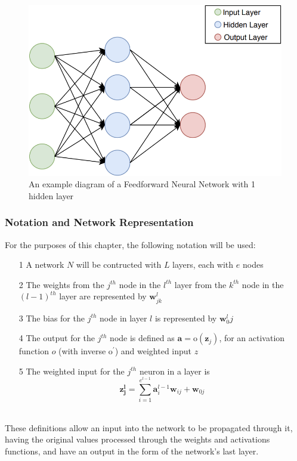 \documentclass[a4paper,11pt,oneside]{article}
\theoremstyle{plain}
\theoremstyle{definition}
\begin{document}
\begin{figure}[H]
	\centering 
	\includegraphics[scale=0.5]{images/implementation/neural_network_diagram.png}
	\caption[Feedforward Neural Network Diagram]{An example diagram of a Feedforward Neural Network with 1 hidden layer}
	\label{figure-neural_network_diagram}
\end{figure}		

\subsubsection{Notation and Network Representation}\label{imp_ffn_functions}

For the purposes of this chapter, the following notation will be used:

\begin{itemize}
\item[1] A network $N$ will be contructed with $L$ layers, each with $e$ nodes
\item[2] The weights from the $j^{th}$ node in the $l^{th}$ layer from the $k^{th}$ node in the $(l-1)^{th}$ layer are represented by $\mathbf{w}^l_{jk}$
\item[3] The bias for the $j^{th}$ node in layer $l$ is represented by $\mathbf{w}^l_0j$
\item[4] The output for the $j^{th}$ node is defined as $\mathbf{a} = \mathrm{o}(\mathbf{z}_j)$, for an activation function $o$ (with inverse $\mathrm{o^{\prime}}$) and weighted input $z$
\item[5] The weighted input for the $j^{th}$ neuron in a layer is 
\begin{equation}\label{eq_weighted_input}
	\mathbf{z^l_j}=\sum_{i=1}^{e^{l-1}}{\mathbf{a}^{l-1}_i\mathbf{w}_{ij}} + \mathbf{w}_{0j}
\end{equation}
\end{itemize}
~\\
These definitions allow an input into the network to be propagated through it, having the original values processed through the weights and activations functions, and have an output in the form of the network's last layer.
\end{document}
